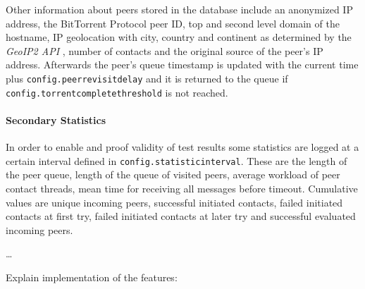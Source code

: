 \documentclass[10pt, a4paper]{scrartcl} %
\renewcommand{\_}{\origunderscore\allowbreak}
\newcommand{\config}[1]{\texttt{config.\allowbreak #1}}
\begin{document}
Other information about peers stored in the database include an anonymized IP address, the BitTorrent Protocol peer ID, top and second level domain of the hostname, IP geolocation with city, country and continent as determined by the \emph{GeoIP2 API} \cite{geoip2-api}, number of contacts and the original source of the peer's IP address. Afterwards the peer's queue timestamp is updated with the current time plus \config{peer\_revisit\_delay} and it is returned to the queue if \config{torrent\_complete\_threshold} is not reached.

\paragraph{Secondary Statistics}
In order to enable and proof validity of test results some statistics are logged at a certain interval defined in \config{statistic\_interval}. These are the length of the peer queue, length of the queue of visited peers, average workload of peer contact threads, mean time for receiving all messages before timeout. Cumulative values are unique incoming peers, successful initiated contacts, failed initiated contacts at first try, failed initiated contacts at later try and successful evaluated incoming peers.

\dots

\noindent\hrulefill

Explain implementation of the features:
\end{document}
